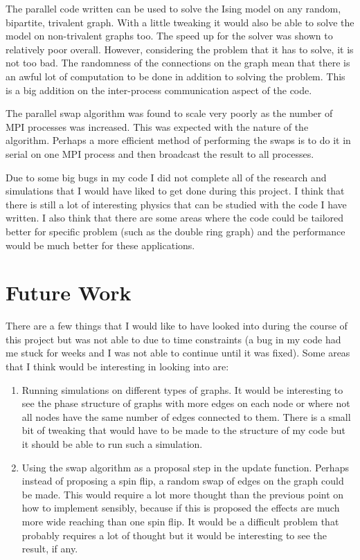 \documentclass[pdftex,12pt,a4paper]{article}
\begin{document}
The parallel code written can be used to solve the Ising model on any random, bipartite, trivalent graph. With a little tweaking it would also be able to solve the model on non-trivalent graphs too. The speed up for the solver was shown to relatively poor overall. However, considering the problem that it has to solve, it is not too bad. The randomness of the connections on the graph mean that there is an awful lot of computation to be done in addition to solving the problem. This is a big addition on the inter-process communication aspect of the code.

The parallel swap algorithm was found to scale very poorly as the number of MPI processes was increased. This was expected with the nature of the algorithm. Perhaps a more efficient method of performing the swaps is to do it in serial on one MPI process and then broadcast the result to all processes.

Due to some big bugs in my code I did not complete all of the research and simulations that I would have liked to get done during this project. I think that there is still a lot of interesting physics that can be studied with the code I have written. I also think that there are some areas where the code could be tailored better for specific problem (such as the double ring graph) and the performance would be much better for these applications.


\newpage

\section{Future Work}

There are a few things that I would like to have looked into during the course of this project but was not able to due to time constraints (a bug in my code had me stuck for weeks and I was not able to continue until it was fixed). Some areas that I think would be interesting in looking into are:
\begin{enumerate}
\item Running simulations on different types of graphs. It would be interesting to see the phase structure of graphs with more edges on each node or where not all nodes have the same number of edges connected to them. There is a small bit of tweaking that would have to be made to the structure of my code but it should be able to run such a simulation.
\item Using the swap algorithm as a proposal step in the update function. Perhaps instead of proposing a spin flip, a random swap of edges on the graph could be made. This would require a lot more thought than the previous point on how to implement sensibly, because if this is proposed the effects are much more wide reaching than one spin flip. It would be a difficult problem that probably requires a lot of thought but it would be interesting to see the result, if any.
\end{enumerate}
\end{document}
